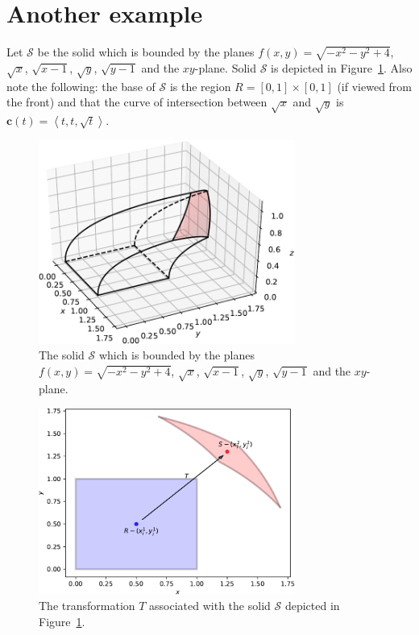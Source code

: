 \documentclass{article}
\theoremstyle{theorem}
\theoremstyle{definition}
\begin{document}

\section{Another example}
Let $\mathcal{S}$ be the solid which is bounded by the planes $f(x,y)=\sqrt{-x^2-y^2+4}$, $\sqrt{x}$, $\sqrt{x-1}$, $\sqrt{y}$, $\sqrt{y-1}$ and the $xy$-plane. Solid $\mathcal{S}$ is depicted 
in Figure~\ref{fig:sphere_solid}. Also note the following: the base of $\mathcal{S}$ is the region 
$R = [0,1]\times [0,1]$ (if viewed from the front) and that the curve of intersection between $\sqrt{x}$ and $\sqrt{y}$ is $\mathbf{c}(t) = \left < t,t,\sqrt{t}\right >$. \\

\begin{figure}[htb]
\centering
\includegraphics[width=0.75\textwidth]{sphere_solid.pdf}
\caption{The solid $\mathcal{S}$ which is bounded by the planes $f(x,y)=\sqrt{-x^2-y^2+4}$, $\sqrt{x}$, $\sqrt{x-1}$, $\sqrt{y}$, $\sqrt{y-1}$ and the $xy$-plane.}
\label{fig:sphere_solid}
\end{figure}

\begin{figure}[htb]
\centering
\includegraphics[width=0.75\textwidth]{sphere_regions.pdf}
\caption{The transformation $T$ associated with the solid $\mathcal{S}$ depicted in Figure~\ref{fig:sphere_solid}.}
\label{fig:sphere_regions}
\end{figure}
\end{document}
